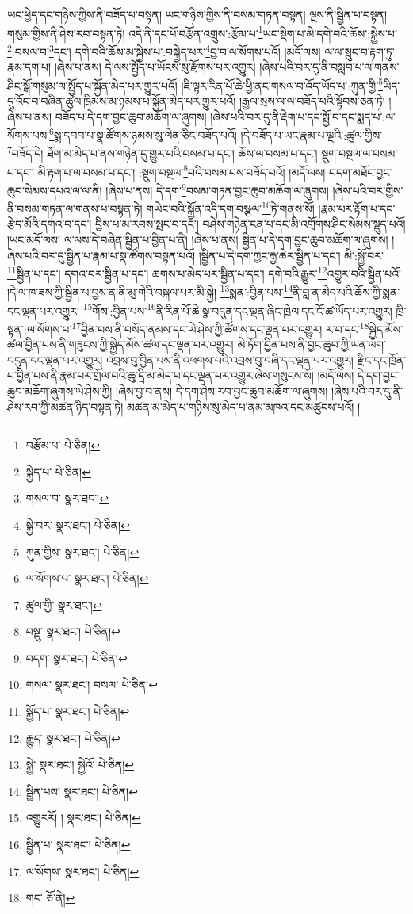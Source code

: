 ཡང་ཕྱེད་དང་གཉིས་ཀྱིས་ནི་བཟོད་པ་བསྟན། ཡང་གཉིས་ཀྱིས་ནི་བསམ་གཏན་བསྟན། ལྔས་ནི་སྦྱིན་པ་བསྟན། གསུམ་གྱིས་ནི་ཤེས་རབ་བསྟན་ཏེ། འདི་ནི་དང་པོ་བརྩོན་འགྲུས་:རྩོམ་པ་\footnote{བརྩོམ་པ་  པེ་ཅིན། }ཡང་སྡིག་པ་མི་དགེ་བའི་ཆོས་:སྐྱེས་པ་\footnote{སྐྱེད་པ་  པེ་ཅིན། }:བསལ་བ་\footnote{གསལ་བ་  སྣར་ཐང་། }དང་། དགེ་བའི་ཆོས་མ་སྐྱེས་པ་:བསྐྱེད་པར་\footnote{སྐྱེ་བར་  སྣར་ཐང་།  པེ་ཅིན། }བྱ་བ་ལ་སོགས་པའོ། །མདོ་ལས། ལ་ལ་སྲུང་བ་རྟག་ཏུ་རྣམ་དག་པ། །ཞེས་པ་ནས། དེ་ལས་སྤྱོད་པ་ཡོངས་སུ་རྫོགས་པར་འགྱུར། །ཞེས་པའི་བར་དུ་ནི་བསླབ་པ་ལ་གནས་ཤིང་སྒོ་གསུམ་ལ་སྤྱོད་པ་སྐྱོན་མེད་པར་གྱུར་པའོ། །ཇི་ལྟར་རིན་པོ་ཆེ་ཕྱི་ནང་གསལ་བ་འོད་ཡོད་པ་:ཀུན་གྱི་\footnote{ཀུན་གྱིས་  སྣར་ཐང་།  པེ་ཅིན། }ཡིད་དུ་འོང་བ་བཞིན་ཚུལ་ཁྲིམས་མ་ཉམས་པ་སྐྱོན་མེད་པར་གྱུར་པའོ། །རྒྱལ་སྲས་ལ་ལ་བཟོད་པའི་སྟོབས་ཅན་ཏེ། །ཞེས་པ་ནས། བཟོད་པ་དེ་དག་བྱང་ཆུབ་མཆོག་ལ་ཞུགས། །ཞེས་པའི་བར་དུ་ནི་རྡེག་པ་དང་སྤྱོ་བ་དང་སྨད་པ་:ལ་སོགས་པས་\footnote{ལ་སོགས་པ་  སྣར་ཐང་།  པེ་ཅིན། }སྨ་དབབ་པ་སྣ་ཚོགས་ཉམས་སུ་ལེན་ཅིང་བཟོད་པའོ། །དེ་བཟོད་པ་ཡང་རྣམ་པ་ལྔའི་:ཚུལ་གྱིས་\footnote{ཚུལ་གྱི་  སྣར་ཐང་། }བཟོད་དེ། ཐོག་མ་མེད་པ་ནས་གཉེན་དུ་གྱུར་པའི་བསམ་པ་དང་། ཆོས་ལ་བསམ་པ་དང་། སྡུག་བསྔལ་ལ་བསམ་པ་དང་། མི་རྟག་པ་ལ་བསམ་པ་དང་། :སྡུག་བསྔལ་\footnote{བསྡུ་  སྣར་ཐང་།  པེ་ཅིན། }བའི་བསམ་པས་བཟོད་པའོ། །མདོ་ལས། བདག་མཐོང་བྱང་ཆུབ་སེམས་དཔའ་ལ་ལ་ནི། །ཞེས་པ་ནས། དེ་དག་\footnote{བདག་  སྣར་ཐང་།  པེ་ཅིན། }བསམ་གཏན་བྱང་ཆུབ་མཆོག་ལ་ཞུགས། །ཞེས་པའི་བར་གྱིས་ནི་བསམ་གཏན་ལ་གནས་པ་བསྟན་ཏེ། གཡེང་བའི་སྐྱོན་འདི་དག་བསྩལ་\footnote{གསལ་  སྣར་ཐང་། བསལ་  པེ་ཅིན། }ཏེ་གནས་སོ། །རྣམ་པར་རྟོག་པ་དང་རྩེད་མོའི་དགའ་བ་དང་། བྱིས་པ་མ་རབས་སྤང་བ་དང་། བཤེས་གཉེན་ངན་པ་དང་མི་འགྲོགས་ཤིང་སེམས་སྡུད་པའོ། །ཡང་མདོ་ལས། ལ་ལས་དེ་བཞིན་སྦྱིན་པ་བྱིན་པ་ནི། །ཞེས་པ་ནས། སྦྱིན་པ་དེ་དག་བྱང་ཆུབ་མཆོག་ལ་ཞུགས། །ཞེས་པའི་བར་དུ་སྦྱིན་པ་རྣམ་པ་སྣ་ཚོགས་བསྟན་པའོ། །སྦྱིན་པ་དེ་དག་ཀྱང་རྒྱ་ཆེར་སྦྱིན་པ་དང་། མི་:སྐྱོ་བར་\footnote{སྐྱོད་པ་  སྣར་ཐང་།  པེ་ཅིན། }སྦྱིན་པ་དང་། དགའ་བར་སྦྱིན་པ་དང་། ཆགས་པ་མེད་པར་སྦྱིན་པ་དང་། དགེ་བའི་རྒྱུར་\footnote{རྒྱུད་  སྣར་ཐང་།  པེ་ཅིན། }འགྱུར་བའི་སྦྱིན་པའོ། །དེ་ལ་ཁ་ཟས་ཀྱི་སྦྱིན་པ་བྱས་ན་ནི་མུ་གེའི་བསྐལ་པར་མི་སྐྱེ། \footnote{སྐྱེ་  སྣར་ཐང་། སྐྱེའོ་  པེ་ཅིན། }སྨན་:བྱིན་པས་\footnote{སྦྱིན་པས་  སྣར་ཐང་།  པེ་ཅིན། }ནི་བླ་ན་མེད་པའི་ཆོས་ཀྱི་སྨན་དང་ལྡན་པར་འགྱུར། \footnote{འགྱུརརོ། །  སྣར་ཐང་།  པེ་ཅིན། }གོས་:བྱིན་པས་\footnote{སྦྱིན་པ་  སྣར་ཐང་།  པེ་ཅིན། }ནི་རིན་པོ་ཆེ་སྣ་བདུན་དང་ལྡན་ཞིང་ཁྲེལ་དང་ངོ་ཚ་ཡོད་པར་འགྱུར། ཁྲི་སྟན་:ལ་སོགས་པ་\footnote{ལ་སོགས་  སྣར་ཐང་།  པེ་ཅིན། }བྱིན་པས་ནི་བསོད་ནམས་དང་ཡེ་ཤེས་ཀྱི་ཚོགས་དང་ལྡན་པར་འགྱུར། ར་བ་དང་\footnote{གང་  ཅོ་ནེ། }སྐྱེད་མོས་ཚལ་བྱིན་པས་ནི་གཟུངས་ཀྱི་སྐྱེད་མོས་ཚལ་དང་ལྡན་པར་འགྱུར། མེ་ཏོག་བྱིན་པས་ནི་བྱང་ཆུབ་ཀྱི་ཡན་ལག་བདུན་དང་ལྡན་པར་འགྱུར། འབྲས་བུ་བྱིན་པས་ནི་འཕགས་པའི་འབྲས་བུ་བཞི་དང་ལྡན་པར་འགྱུར། རྫིང་དང་ཁྲོན་པ་བྱིན་པས་ནི་རྣམ་པར་གྲོལ་བའི་ཆུ་དྲི་མ་མེད་པ་དང་ལྡན་པར་འགྱུར་ཞེས་གསུངས་སོ། །མདོ་ལས། དེ་དག་བྱང་ཆུབ་མཆོག་ཞུགས་ཡེ་ཤེས་ཀྱི། །ཞེས་བྱ་བ་ནས། དེ་དག་ཤེས་རབ་བྱང་ཆུབ་མཆོག་ལ་ཞུགས། །ཞེས་པའི་བར་དུ་ནི་ཤེས་རབ་ཀྱི་མཚན་ཉིད་བསྟན་ཏེ། མཚན་མ་མེད་པ་གཉིས་སུ་མེད་པ་ནམ་མཁའ་དང་མཚུངས་པའོ། །
